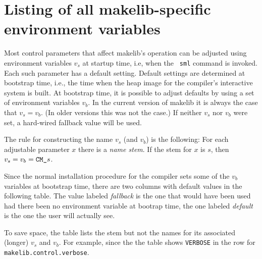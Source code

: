 
\section{Listing of all makelib-specific environment variables}

Most control parameters that affect makelib's operation can be adjusted
using environment variables $v_s$ at startup time, i.e, when the {\tt
sml} command is invoked.  Each such parameter has a default setting.
Default settings are determined at bootstrap time, i.e., the time when
the heap image for the compiler's interactive system is
built.  At bootstrap time, it is possible to
adjust defaults by using a set of environment variables $v_b$.  In the
current version of makelib it is always the case that $v_s = v_b$.  (In
older versions this was not the case.) If neither $v_s$ nor $v_b$ were
set, a hard-wired fallback value will be used.

The rule for constructing the name $v_s$ (and $v_b$) is the
following: For each adjustable parameter $x$ there is a {\em name
stem}.  If the stem for $x$ is $s$, then $v_s = v_b = \mbox{\tt CM\_}s$.

Since the normal installation procedure for the compiler sets some of the
$v_b$ variables at bootstrap time, there are two columns with default
values in the following table.  The value labeled {\em fallback} is
the one that would have been used had there been no environment
variable at bootrap time, the one labeled {\em default} is the one the
user will actually see.

To save space, the table lists the stem but not the names for its
associated (longer) $v_s$ and $v_b$.  For example, since the the table
shows {\tt VERBOSE} in the row for {\tt makelib.control.verbose}.

